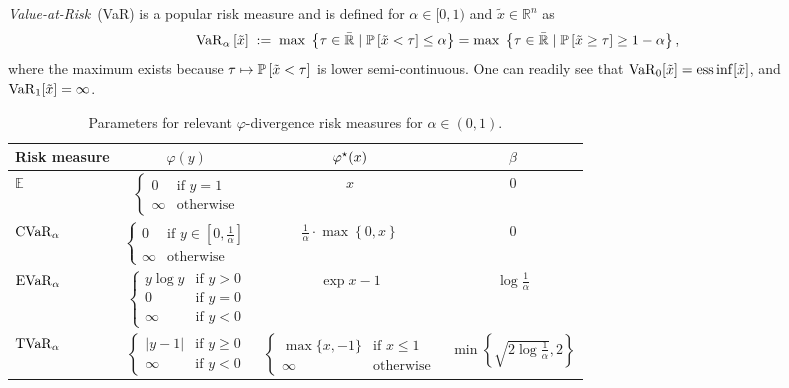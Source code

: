 \emph{Value-at-Risk}~(VaR) is a popular risk measure and is defined for $\alpha\in [0,1)$ and $\tilde{x}\in \mathbb{R}^n$ as~\cite{Follmer2016,Shapiro2014}
\begin{equation}
  \label{eq:var-definition}
  \var{\alpha}{ \tilde{x} }
  \;:=\;
    \max\; \left\{\tau \in \bar{\Real} \mid \P{\tilde{x} < \tau}  \le \alpha\right\} =
    \max\; \left\{\tau \in \bar{\Real} \mid \P{\tilde{x} \ge  \tau}  \ge 1 - \alpha\right\},
\end{equation}
where the maximum exists because $\tau \mapsto \P{\tilde{x} < \tau}$ is lower semi-continuous. One can readily see that $\varo_0[\tilde{x}] = \ess \inf [\tilde{x}]$, and $\varo_{1}[ \tilde{x} ] = \infty$.

\begin{table}
    \caption{Parameters for relevant $\varphi$-divergence risk measures for $\alpha\in (0,1)$.} \label{tab:phi-divergence-risk}
    \centering
    \begin{tabular}{l|c|c|c}
         \toprule
         Risk measure & $\varphi(y)$  & $\varphi\opt(x)$ & $\beta$ \\
         \midrule        
         $\mathbb{E}$           & $\begin{cases} 0 &\text{if } y = 1 \\ \infty & \text{otherwise}  \end{cases}$ & $x$ & $0$  \\
      \midrule
      $\cvaro_{\alpha}$     & $\begin{cases} 0 &\text{if } y \in [0, \frac{1}{\alpha}] \\ \infty & \text{otherwise}  \end{cases}$ & $\frac{1}{\alpha} \cdot \max \left\{ 0,  x \right\} $& $0$ \\
      \midrule
      $\evaro_{\alpha}$     & $\begin{cases} y \log y &\text{if } y > 0 \\ 0 &\text{if } y =  0 \\  \infty &\text{if } y < 0 \end{cases}$ & $\exp{ x - 1 }$  & $\log \frac{1}{\alpha}$ \\
      \midrule
         $\tvaro_{\alpha}$     & $ \begin{cases} |y - 1| &\text{if } y \ge 0 \\  \infty &\text{if } y < 0  \end{cases}$ & $ \begin{cases} \max\{x,-1\} &\text{if } x \le 1 \\ \infty &\text{otherwise} \end{cases} $& $\min \left\{  \sqrt{ 2 \log \frac{1}{\alpha} }, 2\right\}$ \\
         \bottomrule
    \end{tabular}
\end{table}


